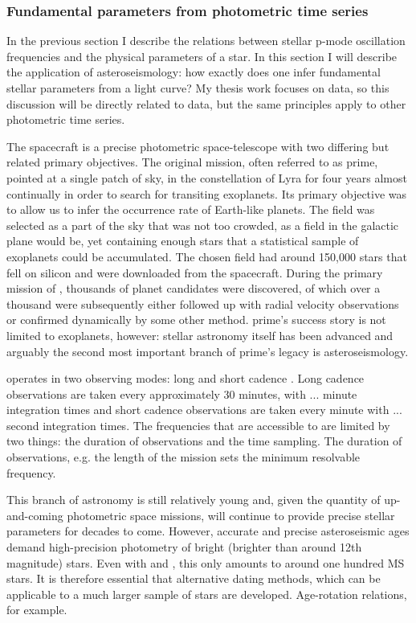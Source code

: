 \subsubsection{Fundamental parameters from photometric time series}

In the previous section I describe the relations between stellar p-mode
oscillation frequencies and the physical parameters of a star.
In this section I will describe the application of asteroseismology: how
exactly does one infer fundamental stellar parameters from a light curve?
My thesis work focuses on \kepler data, so this discussion will be directly
related to \kepler data, but the same principles apply to other photometric
time series.

The \kepler spacecraft is a precise photometric space-telescope with two
differing but related primary objectives.
The original mission, often referred to as \kepler prime, pointed at a single
patch of sky, in the constellation of Lyra for four years almost continually
in order to search for transiting exoplanets.
Its primary objective was to allow us to infer the occurrence rate of
Earth-like planets.
The \kepler field was selected as a part of the sky that was not too crowded,
as a field in the galactic plane would be, yet containing enough stars that a
statistical sample of exoplanets could be accumulated.
The chosen field had around 150,000 stars that fell on silicon and were
downloaded from the spacecraft.
During the primary mission of \kepler, thousands of planet candidates were
discovered, of which over a thousand were subsequently either followed up with
radial velocity observations or confirmed dynamically by some other method.
\kepler prime's success story is not limited to exoplanets, however: stellar
astronomy itself has been advanced and arguably the second most important
branch of \kepler prime's legacy is asteroseismology.

\kepler operates in two observing modes: long and short cadence
\citep[][]{smith2012, stumpe2012}.
Long cadence observations are taken every approximately 30 minutes, with ...
minute integration times and short cadence observations are taken every minute
with ... second integration times.
The frequencies that are accessible to \kepler are limited by two things: the
duration of observations and the time sampling.
The duration of observations, e.g. the length of the \kepler mission sets the
minimum resolvable frequency.

This branch of astronomy is still relatively young and, given the quantity of
up-and-coming photometric space missions, will continue to provide precise
stellar parameters for decades to come.
However, accurate and precise asteroseismic ages demand high-precision
photometry of bright (brighter than around 12th magnitude) stars.
Even with \kepler and \corot, this only amounts to around one hundred MS
stars.
It is therefore essential that alternative dating methods, which can be
applicable to a much larger sample of stars are developed.
Age-rotation relations, for example.

